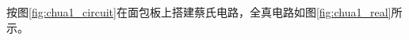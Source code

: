\documentclass[10pt,a4paper,twoside,UTF8]{ctexart}
\begin{document}
按图\ref{fig:chua1_circuit}在面包板上搭建蔡氏电路，全真电路如图\ref{fig:chua1_real}所示。                                                                                                                                                                                                                                                                                                                                                                                                                                                                                                                                                                                                                                                                                                                                                                                                                                                                                                                                                                                                                                                                                                                                                                                                                                                                                                                                                                                                                                                                                                                                                                                                                                                                                                                                                                                                                                                                                                                                                                                                                                                                                                                                                                                                                                                                                                                                                                                                                                                                                                                                                                                                                                                                                                                                                                                                                                                                                                                                                                                                                                                                                                                                                                                                                                                                                                                                      
\end{document}
